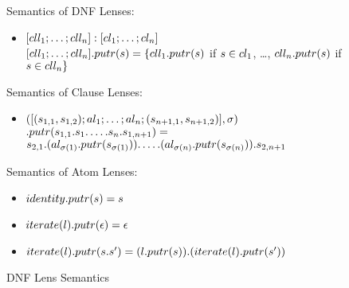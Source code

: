 \begin{figure}
Semantics of DNF Lenses:
\begin{itemize}
\item $[cll_1 ; \ldots ; cll_n] : [cl_1 ; \ldots ; cl_n]$\\
$[cll_1 ; \ldots ; cll_n].putr(s) = 
\{cll_1.putr(s)$ if $s \in cl_1$, \ldots, $cll_n.putr(s)$ if $s \in cll_n\}$
\end{itemize}

Semantics of Clause Lenses:
\begin{itemize}
\item $([(s_{1,1},s_{1,2}) ; al_1; \ldots; al_n ; (s_{n+1,1},s_{n+1,2})],\sigma)$
$.putr(s_{1,1}.s_1. \ldots .s_n.s_{1,n+1}) = $
$s_{2,1}.(al_{\sigma(1)}.putr(s_{\sigma(1)})). \ldots . (al_{\sigma(n)}.putr(s_{\sigma(n)})).s_{2,n+1}$
\end{itemize}

Semantics of Atom Lenses:
\begin{itemize}
\item $identity.putr(s)=s$
\item $iterate(l).putr(\epsilon) = \epsilon$
\item $iterate(l).putr(s . s') = (l.putr(s)) . (iterate(l).putr(s'))$
\end{itemize}
\caption{DNF Lens Semantics}
\label{fig:dnf-lens-semantics}
\end{figure}
